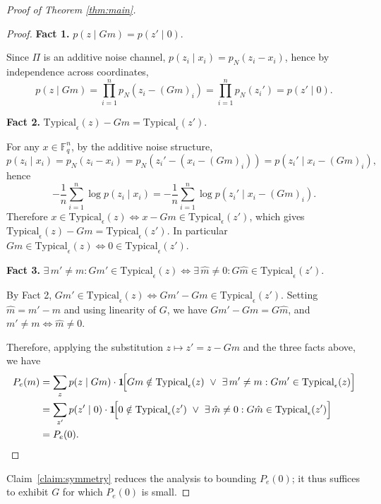 \documentclass[11pt]{article}
\theoremstyle{named}
\begin{document}
\begin{proof}[Proof of Theorem \ref{thm:main}]
\begin{proof}
\medskip
\noindent\textbf{Fact 1.} $p(z \mid Gm) = p(z' \mid 0)$.

Since $\Pi$ is an additive noise channel, $p(z_i \mid x_i) = p_N(z_i - x_i)$, 
hence by independence across coordinates,
\[
p(z \mid Gm) 
= \prod_{i=1}^n p_N(z_i - (Gm)_i) 
= \prod_{i=1}^n p_N(z_i') 
= p(z' \mid 0).
\]

\medskip
\noindent\textbf{Fact 2.} $\mathrm{Typical}_\epsilon(z) - Gm = 
\mathrm{Typical}_\epsilon(z')$.

For any $x \in \mathbb{F}_q^n$, by the additive noise structure,
\[
p(z_i \mid x_i) = p_N(z_i - x_i) = p_N(z_i' - (x_i - (Gm)_i)) 
= p(z_i' \mid x_i - (Gm)_i),
\]
hence
\[
-\frac{1}{n}\sum_{i=1}^n \log p(z_i \mid x_i) 
= -\frac{1}{n}\sum_{i=1}^n \log p(z_i' \mid x_i - (Gm)_i).
\]
Therefore $x \in \mathrm{Typical}_\epsilon(z) \iff 
x - Gm \in \mathrm{Typical}_\epsilon(z')$, which gives 
$\mathrm{Typical}_\epsilon(z) - Gm = \mathrm{Typical}_\epsilon(z')$. In particular $Gm \in \mathrm{Typical}_\epsilon(z) \iff 
0 \in \mathrm{Typical}_\epsilon(z')$.

\medskip
\noindent\textbf{Fact 3.} $\exists\, m' \neq m : Gm' \in 
\mathrm{Typical}_\epsilon(z) \iff \exists\, \hat{m} \neq 0 : 
G\hat{m} \in \mathrm{Typical}_\epsilon(z')$.

By Fact 2, $Gm' \in \mathrm{Typical}_\epsilon(z) \iff Gm' - Gm 
\in \mathrm{Typical}_\epsilon(z')$. Setting $\hat{m} = m' - m$ 
and using linearity of $G$, we have $Gm' - Gm = G\hat{m}$, and 
$m' \neq m \iff \hat{m} \neq 0$.

\medskip
Therefore, applying the substitution $z \mapsto 
z' = z - Gm$ and the three facts above, we have
\begin{align*}
P_e(m) 
&= \sum_{z} p(z \mid Gm)\cdot\mathbf{1}\!\Big[
    Gm \notin \mathrm{Typical}_\epsilon(z)\ \vee\ 
    \exists\, m' \neq m : Gm' \in \mathrm{Typical}_\epsilon(z)
\Big] \\
&= \sum_{z'} p(z' \mid 0)\cdot\mathbf{1}\!\Big[
    0 \notin \mathrm{Typical}_\epsilon(z')\ \vee\ 
    \exists\, \hat{m} \neq 0 : G\hat{m} \in \mathrm{Typical}_\epsilon(z')
\Big] \\
&= P_e(0). \qedhere
\end{align*}
\end{proof}

Claim~\ref{claim:symmetry} reduces the analysis to bounding $P_e(0)$; it thus suffices to exhibit $G$ for which $P_e(0)$ is small.


\end{proof}
\end{document}
